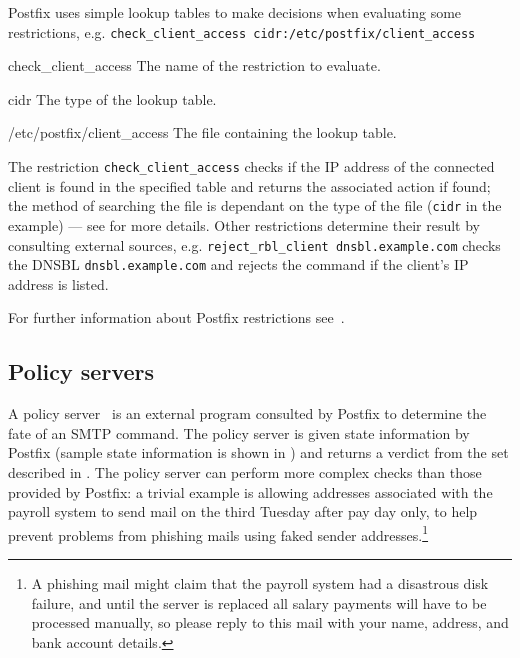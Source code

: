 Postfix uses simple lookup tables to make decisions when evaluating some
restrictions, e.g.\newline{}
\tab{}\texttt{check\_client\_access~cidr:/etc/postfix/client\_access}

\begin{eqlist}

    \item [check\_client\_access] The name of the restriction to evaluate.

    \item [cidr] The type of the lookup table.

    \item [/etc/postfix/client\_access] The file containing the lookup
        table.

\end{eqlist}

The restriction \texttt{check\_client\_access} checks if the \gls{IP}
address of the connected client is found in the specified table and returns
the associated action if found; the method of searching the file is
dependant on the type of the file (\texttt{cidr} in the example) --- see
\cite{postfix-lookup-tables} for more details.  Other restrictions
determine their result by consulting external sources, e.g.\newline{}
\tab{}\texttt{reject\_rbl\_client dnsbl.example.com}\newline{} checks the
\gls{DNSBL} \texttt{dnsbl.example.com} and rejects the command if the
client's \gls{IP} address is listed.

For further information about Postfix restrictions
see~\cite{smtpd_access_readme,smtpd_per_user_control,policy-servers}.

\subsection{Policy servers}

\label{policy servers}

A policy server~\cite{policy-servers} is an external program consulted by
Postfix to determine the fate of an \gls{SMTP} command.  The policy server
is given state information by Postfix (sample state information is shown in
) and returns a verdict
from the set described in .  The policy server can perform more complex checks than
those provided by Postfix: a trivial example is allowing addresses
associated with the payroll system to send mail on the third Tuesday after
pay day only, to help prevent problems from phishing mails using faked
sender addresses.\footnote{A phishing mail might claim that the payroll
system had a disastrous disk failure, and until the server is replaced all
salary payments will have to be processed manually, so please reply to this
mail with your name, address, and bank account details.}

